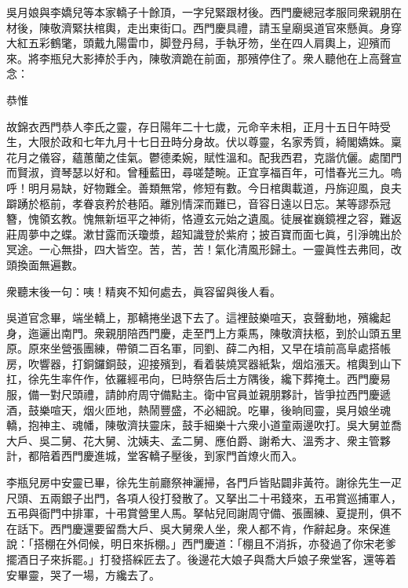 吳月娘與李嬌兒等本家轎子十餘頂，一字兒緊跟材後。西門慶總冠孝服同衆親朋在材後，陳敬濟緊扶棺輿，走出東街口。西門慶具禮，請玉皇廟吳道官來懸眞。身穿大紅五彩鶴氅，頭戴九陽雷巾，脚登丹舄，手執牙笏，坐在四人肩輿上，迎殯而來。將李瓶兒大影捧於手內，陳敬濟跪在前面，那殯停住了。衆人聽他在上高聲宣念：

\begin{myquote}[\markfont]
恭惟

故錦衣西門恭人李氏之靈，存日陽年二十七歲，元命辛未相，正月十五日午時受生，大限於政和七年九月十七日丑時分身故。伏以尊靈，名家秀質，綺閣嬌姝。稟花月之儀容，蘊蕙蘭之佳氣。鬱德柔婉，賦性溫和。配我西君，克諧伉儷。處閨門而賢淑，資琴瑟以好和。曾種藍田，尋嗟楚畹。正宜享福百年，可惜春光三九。{}嗚呼！明月易缺，好物難全。善類無常，修短有數。今日棺輿載道，丹旆迎風，良夫躃踴於柩前，孝眷哀矜於巷陌。離別情深而難已，音容日遠以日忘。某等謬忝冠簪，愧領玄教。愧無新垣平之神術，{}恪遵玄元始之遺風。徒展崔巍鏡裡之容，難返莊周夢中之蝶。漱甘露而沃瓊漿，超知識登於紫府；披百寶而面七眞，引淨魄出於冥途。一心無掛，四大皆空。苦，苦，苦！氣化清風形歸土。一靈眞性去弗囘，改頭換面無遍數。

衆聽末後一句：咦！精爽不知何處去，眞容留與後人看。
\end{myquote}

吳道官念畢，端坐轎上，那轎捲坐退下去了。這裡鼓樂喧天，哀聲動地，殯纔起身，迤邐出南門。衆親朋陪西門慶，走至門上方乘馬，陳敬濟扶柩，到於山頭五里原。原來坐營張團練，帶領二百名軍，同劉、薛二內相，又早在墳前高阜處搭帳房，吹響器，打銅鑼銅鼓，迎接殯到，{}看着裝燒冥器紙紮，烟焰漲天。棺輿到山下扛，徐先生率仵作，依羅經弔向，巳時祭告后土方隅後，纔下葬掩土。西門慶易服，備一對尺頭禮，請帥府周守備點主。衛中官員並親朋夥計，皆爭拉西門慶遞酒，鼓樂喧天，烟火匝地，熱鬧豐盛，不必細說。吃畢，後晌囘靈，吳月娘坐魂轎，抱神主、魂幡，陳敬濟扶靈床，鼓手細樂十六衆小道童兩邊吹打。吳大舅並喬大戶、吳二舅、花大舅、沈姨夫、孟二舅、應伯爵、謝希大、溫秀才、衆主管夥計，都陪着西門慶進城，堂客轎子壓後，到家門首燎火而入。

李瓶兒房中安靈已畢，徐先生前廳祭神灑掃，各門戶皆貼闢非黃符。謝徐先生一疋尺頭、五兩銀子出門，各項人役打發散了。又拏出二十弔錢來，五弔賞巡捕軍人，五弔與衙門中排軍，十弔賞營里人馬。拏帖兒囘謝周守備、張團練、夏提刑，俱不在話下。西門慶還要留喬大戶、吳大舅衆人坐，衆人都不肯，作辭起身。來保進說：「搭棚在外伺候，明日來拆棚。」西門慶道：「棚且不消拆，亦發過了你宋老爹擺酒日子來拆罷。」打發搭綵匠去了。後邊花大娘子與喬大戶娘子衆堂客，還等着安畢靈，哭了一場，方纔去了。

